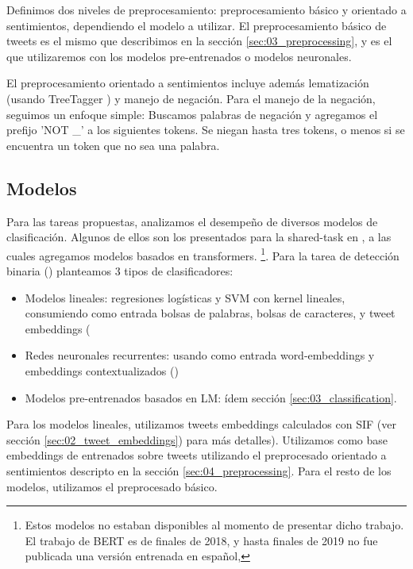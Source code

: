 Definimos dos niveles de preprocesamiento: preprocesamiento básico y orientado a sentimientos, dependiendo el modelo a utilizar. El preprocesamiento básico de tweets es el mismo que describimos en la sección \ref{sec:03_preprocessing}, y es el que utilizaremos con los modelos pre-entrenados o modelos neuronales.

El preprocesamiento orientado a sentimientos incluye además lematización (usando TreeTagger \cite{schmid95}) y manejo de negación.
Para el manejo de la negación, seguimos un enfoque simple:
Buscamos palabras de negación y agregamos el prefijo 'NOT \_' a los siguientes tokens. Se niegan hasta tres tokens, o menos si se encuentra un token que no sea una palabra.

\subsection{Modelos}

Para las tareas propuestas, analizamos el desempeño de diversos modelos de clasificación. Algunos de ellos son los presentados para la shared-task \hateval{} en \citet{atalaya_tass2018}, a las cuales agregamos modelos basados en transformers. \footnote{Estos modelos no estaban disponibles al momento de presentar dicho trabajo. El trabajo de BERT\cite{devlin2018bert} es de finales de 2018, y hasta finales de 2019 no fue publicada una versión entrenada en español, \beto{}}. Para la tarea de detección binaria (\subtaska{}) planteamos 3 tipos de clasificadores:

\begin{itemize}
    \item Modelos lineales: regresiones logísticas y SVM con kernel lineales, consumiendo como entrada bolsas de palabras, bolsas de caracteres, y tweet embeddings (
    \item Redes neuronales recurrentes: usando como entrada word-embeddings y embeddings contextualizados (\elmo{})
    \item Modelos pre-entrenados basados en LM: ídem sección \ref{sec:03_classification}.
\end{itemize}

Para los modelos lineales, utilizamos tweets embeddings calculados con SIF (ver sección \ref{sec:02_tweet_embeddings}) para más detalles). Utilizamos como base embeddings de \fasttext{} entrenados sobre tweets utilizando el preprocesado orientado a sentimientos descripto en la sección \ref{sec:04_preprocessing}. Para el resto de los modelos, utilizamos el preprocesado básico.

